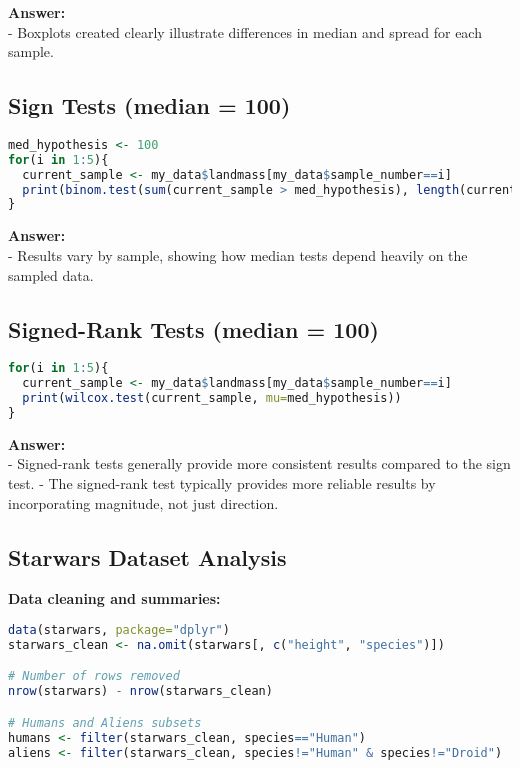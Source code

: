 \documentclass{article}
\begin{document}
\textbf{Answer:}\\
- Boxplots created clearly illustrate differences in median and spread for each sample.

\subsection*{Sign Tests (median = 100)}

\begin{lstlisting}[language=R]
med_hypothesis <- 100
for(i in 1:5){
  current_sample <- my_data$landmass[my_data$sample_number==i]
  print(binom.test(sum(current_sample > med_hypothesis), length(current_sample), alternative="two.sided"))
}
\end{lstlisting}

\textbf{Answer:}\\
- Results vary by sample, showing how median tests depend heavily on the sampled data.

\subsection*{Signed-Rank Tests (median = 100)}

\begin{lstlisting}[language=R]
for(i in 1:5){
  current_sample <- my_data$landmass[my_data$sample_number==i]
  print(wilcox.test(current_sample, mu=med_hypothesis))
}
\end{lstlisting}

\textbf{Answer:}\\
- Signed-rank tests generally provide more consistent results compared to the sign test.
- The signed-rank test typically provides more reliable results by incorporating magnitude, not just direction.

\subsection*{Starwars Dataset Analysis}

\textbf{Data cleaning and summaries:}

\begin{lstlisting}[language=R]
data(starwars, package="dplyr")
starwars_clean <- na.omit(starwars[, c("height", "species")])

# Number of rows removed
nrow(starwars) - nrow(starwars_clean)

# Humans and Aliens subsets
humans <- filter(starwars_clean, species=="Human")
aliens <- filter(starwars_clean, species!="Human" & species!="Droid")
\end{lstlisting}
\end{document}
